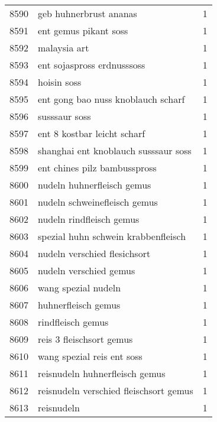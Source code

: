 \begin{tabular}{llr}
8590 &                             geb huhnerbrust ananas &      1 \\
8591 &                              ent gemus pikant soss &      1 \\
8592 &                                       malaysia art &      1 \\
8593 &                         ent sojaspross erdnusssoss &      1 \\
8594 &                                        hoisin soss &      1 \\
8595 &                 ent gong bao nuss knoblauch scharf &      1 \\
8596 &                                      susssaur soss &      1 \\
8597 &                        ent 8 kostbar leicht scharf &      1 \\
8598 &               shanghai ent knoblauch susssaur soss &      1 \\
8599 &                       ent chines pilz bambusspross &      1 \\
8600 &                         nudeln huhnerfleisch gemus &      1 \\
8601 &                       nudeln schweinefleisch gemus &      1 \\
8602 &                           nudeln rindfleisch gemus &      1 \\
8603 &                spezial huhn schwein krabbenfleisch &      1 \\
8604 &                       nudeln verschied flesichsort &      1 \\
8605 &                             nudeln verschied gemus &      1 \\
8606 &                                wang spezial nudeln &      1 \\
8607 &                                huhnerfleisch gemus &      1 \\
8608 &                                  rindfleisch gemus &      1 \\
8609 &                           reis 3 fleischsort gemus &      1 \\
8610 &                         wang spezial reis ent soss &      1 \\
8611 &                     reisnudeln huhnerfleisch gemus &      1 \\
8612 &             reisnudeln verschied fleischsort gemus &      1 \\
8613 &                                         reisnudeln &      1 \\

\end{tabular}
